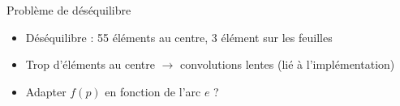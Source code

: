 \begin{frame}{Problème de déséquilibre}
\begin{itemize}
\item \alert{Déséquilibre :} 55 éléments au centre, 3 élément sur les feuilles
	\begin{figure}\centering
	\end{figure}
\item Trop d'éléments au centre $\rightarrow$ convolutions lentes (lié à l'implémentation)
\item Adapter $f(p)$ en fonction de l'arc $e$ ?

\end{itemize}
\end{frame}



